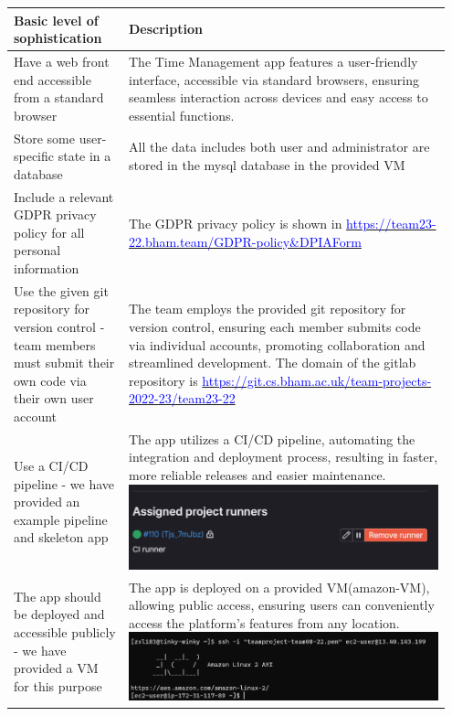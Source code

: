 \documentclass[a4paper]{article}
\begin{document}
\newpage
{\noindent\begin{tabular}{|p{0.25\linewidth}|p{0.70\linewidth}|} 
	\hline
 \textbf{Basic level of sophistication} & \textbf{Description} \\
 \hline
 Have a web front end accessible from a standard browser & The Time Management app features a user-friendly interface, accessible via standard browsers, ensuring seamless interaction across devices and easy access to essential functions.\\
 \hline
 Store some user-specific state in a database&  All the data includes both user and administrator are stored in the mysql database in the provided VM\\
 \hline
 Include a relevant GDPR privacy policy for all personal information & The GDPR privacy policy is shown in \href{https://team23-22.bham.team/GDPR-policy&DPIAForm}{\textcolor{blue}{https://team23-22.bham.team/GDPR-policy\&DPIAForm}}\\
 \hline
 Use the given git repository for version control - team members must submit their own code via their own user account&  The team employs the provided git repository for version control, ensuring each member submits code via individual accounts, promoting collaboration and streamlined development. The domain of the gitlab repository is \href{https://git.cs.bham.ac.uk/team-projects-2022-23/team23-22}{\textcolor{blue}{https://git.cs.bham.ac.uk/team-projects-2022-23/team23-22}}\\
 \hline
 Use a CI/CD pipeline - we have provided an example pipeline and skeleton app&  The app utilizes a CI/CD pipeline, automating the integration and deployment process, resulting in faster, more reliable releases and easier maintenance. \includegraphics[width=10cm]{./image/CI_CD.png}\\
 \hline
 The app should be deployed and accessible publicly - we have provided a VM for this purpose& The app is deployed on a provided VM(amazon-VM), allowing public access, ensuring users can conveniently access the platform's features from any location.\includegraphics[width=9cm]{./image/VM.png}\\

\end{tabular}}
\end{document}
